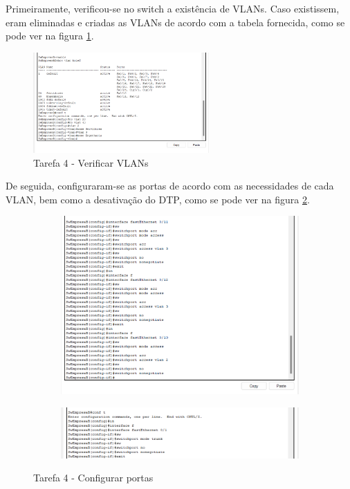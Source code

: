 \documentclass[11pt,english, openright, oneside]{book}
\begin{document}
Primeiramente, verificou-se no switch a existência de VLANs. Caso existissem, eram eliminadas e criadas as VLANs de acordo com a tabela fornecida, como se pode ver na figura \ref{fig:4.1.1}.

\begin{figure}[H]
    \centering
    \includegraphics[width=0.6\textwidth]{imagens/Tarefa4/4.1.1.png}
    \caption{Tarefa 4 - Verificar VLANs}
    \label{fig:4.1.1}
\end{figure}
\vspace{0.2cm}

De seguida, configuraram-se as portas de acordo com as necessidades de cada VLAN, bem como a desativação do DTP, como se pode ver na figura \ref{fig:4.1.2}.

\begin{figure}[h]
    \centering
    \begin{subfigure}{.53\textwidth}
        \centering
        \includegraphics[width=0.99\linewidth]{imagens/Tarefa4/4.1.2.png}
    \end{subfigure}%
    \begin{subfigure}{.53\textwidth}
        \centering
        \includegraphics[width=0.99\linewidth]{imagens/Tarefa4/4.1.3.png}
    \end{subfigure}
    \caption{Tarefa 4 - Configurar portas}
    \label{fig:4.1.2}
\end{figure}
\vspace{0.2cm}
\end{document}
